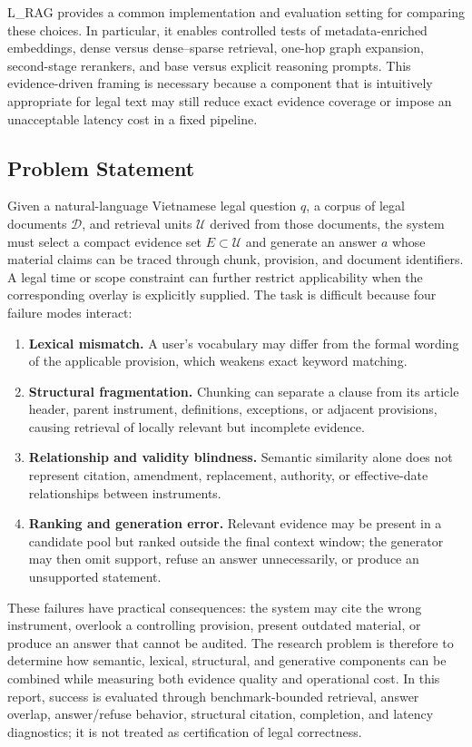 L\_RAG provides a common implementation and evaluation setting for comparing
these choices. In particular, it enables controlled tests of metadata-enriched
embeddings, dense versus dense--sparse retrieval, one-hop graph expansion,
second-stage rerankers, and base versus explicit reasoning prompts. This
evidence-driven framing is necessary because a component that is intuitively
appropriate for legal text may still reduce exact evidence coverage or impose
an unacceptable latency cost in a fixed pipeline.

\subsection{Problem Statement}
\label{sec:problem-statement}

Given a natural-language Vietnamese legal question $q$, a corpus of legal
documents $\mathcal{D}$, and retrieval units $\mathcal{U}$ derived from those
documents, the system must select a compact evidence set
$E \subset \mathcal{U}$ and generate an answer $a$ whose material claims can
be traced through chunk, provision, and document identifiers. A legal time or
scope constraint can further restrict applicability when the corresponding
overlay is explicitly supplied. The task is difficult because four failure
modes interact:

\begin{enumerate}
    \item \textbf{Lexical mismatch.} A user's vocabulary may differ from the
    formal wording of the applicable provision, which weakens exact keyword
    matching.
    \item \textbf{Structural fragmentation.} Chunking can separate a clause
    from its article header, parent instrument, definitions, exceptions, or
    adjacent provisions, causing retrieval of locally relevant but incomplete
    evidence.
    \item \textbf{Relationship and validity blindness.} Semantic similarity
    alone does not represent citation, amendment, replacement, authority, or
    effective-date relationships between instruments.
    \item \textbf{Ranking and generation error.} Relevant evidence may be
    present in a candidate pool but ranked outside the final context window;
    the generator may then omit support, refuse an answer unnecessarily, or
    produce an unsupported statement.
\end{enumerate}

These failures have practical consequences: the system may cite the wrong
instrument, overlook a controlling provision, present outdated material, or
produce an answer that cannot be audited. The research problem is therefore
to determine how semantic, lexical, structural, and generative components can
be combined while measuring both evidence quality and operational cost. In
this report, success is evaluated through benchmark-bounded retrieval, answer
overlap, answer/refuse behavior, structural citation, completion, and latency
diagnostics; it is not treated as certification of legal correctness.

